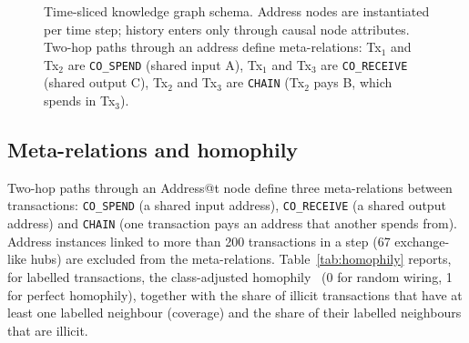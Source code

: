 \begin{figure}[t]
\centering
{}
\caption{Time-sliced knowledge graph schema. Address nodes are instantiated per
time step; history enters only through causal node attributes. Two-hop paths
through an address define meta-relations: Tx$_1$ and Tx$_2$ are
\texttt{CO\_SPEND} (shared input A), Tx$_1$ and Tx$_3$ are
\texttt{CO\_RECEIVE} (shared output C), Tx$_2$ and Tx$_3$ are \texttt{CHAIN}
(Tx$_2$ pays B, which spends in Tx$_3$).}
\label{fig:schema}
\end{figure}

\subsection{Meta-relations and homophily}
Two-hop paths through an Address@t node define three meta-relations between
transactions: \texttt{CO\_SPEND} (a shared input address),
\texttt{CO\_RECEIVE} (a shared output address) and \texttt{CHAIN} (one
transaction pays an address that another spends from). Address instances
linked to more than 200 transactions in a step (67 exchange-like hubs) are
excluded from the meta-relations. Table~\ref{tab:homophily} reports, for
labelled transactions, the class-adjusted homophily~\cite{platonov2023}
(0 for random wiring, 1 for perfect homophily), together with the share of
illicit transactions that have at least one labelled neighbour (coverage) and
the share of their labelled neighbours that are illicit.

